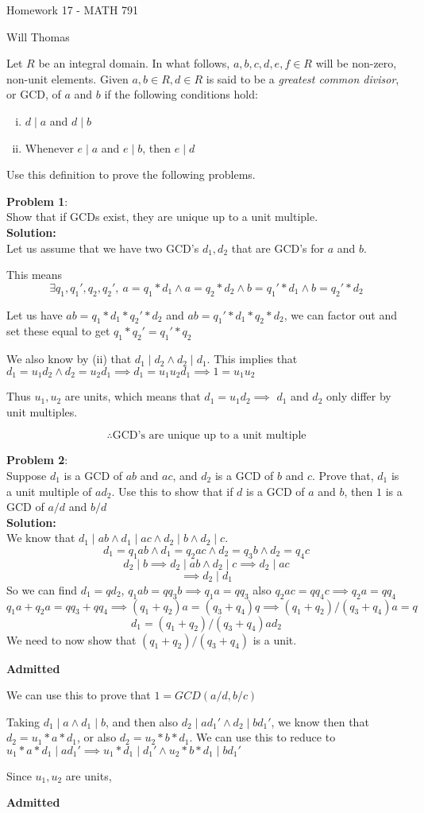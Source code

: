 \documentclass[11pt]{article}
\newcommand{\prob}[3]{\begin{flushleft}
        \textbf{Problem #1}: \\
        #2 
		\textbf{Solution:} 
		#3

\end{flushleft}}
\newcommand{\admit}{
  \begin{flushright}
    \textbf{Admitted}
  \end{flushright}
}
\newcommand{\makeHWtitle}[1]{
    \begin{center}
    \Large{Homework #1 - MATH 791} 
        \vspace{5pt}
        
        \normalsize{Will Thomas}
        \vspace{5pt}
    \end{center}
}
\begin{document}
\makeHWtitle{17}
Let $R$ be an integral domain. In what follows, $a,b,c,d,e,f \in R$ will be non-zero, non-unit elements.
Given $a,b \in R, d \in R$ is said to be a \emph{greatest common divisor}, or GCD, of $a$ and $b$ if the
following conditions hold:
\begin{enumerate}[(i)]
  \item $d \mid a$ and $d \mid b$
  \item Whenever $e \mid a$ and $e \mid b$, then $e \mid d$
\end{enumerate}
Use this definition to prove the following problems.

\prob{1}{
  Show that if GCDs exist, they are unique up to a unit multiple. \\
}{ \\
  Let us assume that we have two GCD's $d_1, d_2$ that are GCD's for $a$ and $b$.

  This means
  $$\exists q_1, q_1', q_2, q_2',\ a = q_1*d_1 \land a = q_2 * d_2 \land b = q_1' * d_1 \land b = q_2' * d_2$$

  Let us have $ab = q_1 * d_1 * q_2' * d_2$ and $ab = q_1' * d_1 * q_2 * d_2$, we can factor out and set these equal to get $q_1 * q_2' = q_1' * q_2$

  We also know by (ii) that $d_1 \mid d_2 \land d_2 \mid d_1$.
  This implies that $d_1 = u_1 d_2 \land d_2 = u_2 d_1 \implies d_1 = u_1 u_2 d_1 \implies 1 = u_1 u_2$

  Thus $u_1, u_2$ are units, which means that $d_1 = u_1 d_2 \implies $ $d_1$ and $d_2$ only differ by unit multiples.

  $$\therefore \text{GCD's are unique up to a unit multiple}$$
}

\prob{2}{
  Suppose $d_1$ is a GCD of $ab$ and $ac$, and $d_2$ is a GCD of $b$ and $c$.
  Prove that, $d_1$ is a unit multiple of $ad_2$.
  Use this to show that if $d$ is a GCD of $a$ and $b$, then $1$ is a GCD of $a/d$ and $b/d$ \\
}{ \\
  We know that $d_1 \mid ab \land d_1 \mid ac \land d_2 \mid b \land d_2 \mid c$.
  $$d_1 = q_1 ab \land d_1 = q_2 ac \land d_2 = q_3 b \land d_2 = q_4 c$$
  $$d_2 \mid b \implies d_2 \mid ab \land d_2 \mid c \implies d_2 \mid ac$$
  $$\implies d_2 \mid d_1$$
  So we can find $d_1 = q d_2$, $q_1 a b = q q_3 b \implies q_1 a = q q_3$ also $q_2 a c = q q_4 c \implies q_2 a = q q_4$
  $$q_1 a + q_2 a = q q_3 + q q_4 \implies (q_1 + q_2) a = (q_3 + q_4) q \implies (q_1 + q_2)/(q_3 + q_4) a = q$$
  $$d_1 = (q_1 + q_2)/(q_3 + q_4) a d_2$$
  We need to now show that $(q_1 + q_2)/(q_3 + q_4)$ is a unit.

  \admit

  We can use this to prove that $1 = GCD(a/d, b/c)$

  Taking $d_1 \mid a \land d_1 \mid b$, and then also $d_2 \mid ad_1' \land d_2 \mid bd_1'$, we know then that
  $d_2 = u_1 * a * d_1$, or also $d_2 = u_2 * b * d_1$.
  We can use this to reduce to $u_1 * a * d_1 \mid ad_1' \implies u_1 * d_1 \mid d_1' \land u_2 * b * d_1 \mid b d_1'$

  Since $u_1, u_2$ are units,

  \admit
}
\end{document}
